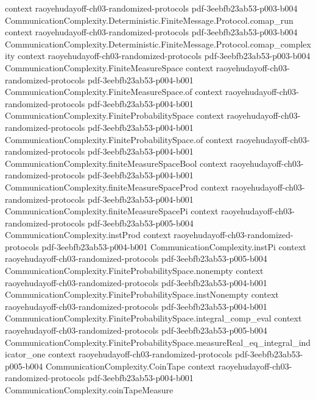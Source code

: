 \begin{theorem}
  {context}
  {raoyehudayoff-ch03-randomized-protocols}
  {pdf-3eebfb23ab53-p003-b004}
\proofstep
  {CommunicationComplexity.Deterministic.FiniteMessage.Protocol.comap_run}
  {context}
  {raoyehudayoff-ch03-randomized-protocols}
  {pdf-3eebfb23ab53-p003-b004}
\proofstep
  {CommunicationComplexity.Deterministic.FiniteMessage.Protocol.comap_complexity}
  {context}
  {raoyehudayoff-ch03-randomized-protocols}
  {pdf-3eebfb23ab53-p003-b004}
\proofstep
  {CommunicationComplexity.FiniteMeasureSpace}
  {context}
  {raoyehudayoff-ch03-randomized-protocols}
  {pdf-3eebfb23ab53-p004-b001}
\proofstep
  {CommunicationComplexity.FiniteMeasureSpace.of}
  {context}
  {raoyehudayoff-ch03-randomized-protocols}
  {pdf-3eebfb23ab53-p004-b001}
\proofstep
  {CommunicationComplexity.FiniteProbabilitySpace}
  {context}
  {raoyehudayoff-ch03-randomized-protocols}
  {pdf-3eebfb23ab53-p004-b001}
\proofstep
  {CommunicationComplexity.FiniteProbabilitySpace.of}
  {context}
  {raoyehudayoff-ch03-randomized-protocols}
  {pdf-3eebfb23ab53-p004-b001}
\proofstep
  {CommunicationComplexity.finiteMeasureSpaceBool}
  {context}
  {raoyehudayoff-ch03-randomized-protocols}
  {pdf-3eebfb23ab53-p004-b001}
\proofstep
  {CommunicationComplexity.finiteMeasureSpaceProd}
  {context}
  {raoyehudayoff-ch03-randomized-protocols}
  {pdf-3eebfb23ab53-p004-b001}
\proofstep
  {CommunicationComplexity.finiteMeasureSpacePi}
  {context}
  {raoyehudayoff-ch03-randomized-protocols}
  {pdf-3eebfb23ab53-p005-b004}
\proofstep
  {CommunicationComplexity.instProd}
  {context}
  {raoyehudayoff-ch03-randomized-protocols}
  {pdf-3eebfb23ab53-p004-b001}
\proofstep
  {CommunicationComplexity.instPi}
  {context}
  {raoyehudayoff-ch03-randomized-protocols}
  {pdf-3eebfb23ab53-p005-b004}
\proofstep
  {CommunicationComplexity.FiniteProbabilitySpace.nonempty}
  {context}
  {raoyehudayoff-ch03-randomized-protocols}
  {pdf-3eebfb23ab53-p004-b001}
\proofstep
  {CommunicationComplexity.FiniteProbabilitySpace.instNonempty}
  {context}
  {raoyehudayoff-ch03-randomized-protocols}
  {pdf-3eebfb23ab53-p004-b001}
\proofstep
  {CommunicationComplexity.FiniteProbabilitySpace.integral_comp_eval}
  {context}
  {raoyehudayoff-ch03-randomized-protocols}
  {pdf-3eebfb23ab53-p005-b004}
\proofstep
  {CommunicationComplexity.FiniteProbabilitySpace.measureReal_eq_integral_indicator_one}
  {context}
  {raoyehudayoff-ch03-randomized-protocols}
  {pdf-3eebfb23ab53-p005-b004}
\proofstep
  {CommunicationComplexity.CoinTape}
  {context}
  {raoyehudayoff-ch03-randomized-protocols}
  {pdf-3eebfb23ab53-p004-b001}
\proofstep
  {CommunicationComplexity.coinTapeMeasure}

\end{theorem}
